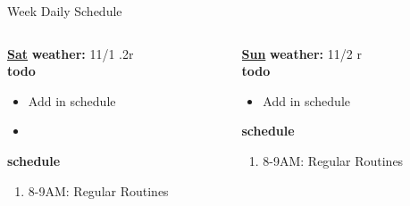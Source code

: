 \begin{columns}
\begin{column}{0.6\linewidth}
\begin{block}{Week Daily Schedule}
\begin{columns}
          \begin{column}{0.15\textwidth}{\small \underline{\bf Sat}}
            {\tiny \bf weather: } {\tiny 11/1 .2r} \\ 
            { \tiny \bf todo} \\ 
            \begin{itemize}
              \tiny \item \tiny Add in schedule
            \item \tiny 
            \end{itemize} 
                {\tiny \bf schedule} \\
                \begin{enumerate} 
                  \tiny \item \tiny 8-9AM: Regular Routines 
                \end{enumerate}
          \end{column}
         
          \begin{column}{0.15\textwidth}{\small \underline{\bf Sun}}
            {\tiny {\bf weather:} } {\tiny 11/2 r} \\ 
            {\tiny {\bf todo}}\\
            \begin{itemize}
              \tiny \item \tiny Add in schedule
            \end{itemize} 
                {\tiny \bf schedule}\\
                \begin{enumerate} 
                  \tiny \item \tiny 8-9AM: Regular Routines 
                \end{enumerate}
          \end{column}
        \end{columns}
      \end{block}
\end{column}
    

\end{columns}
